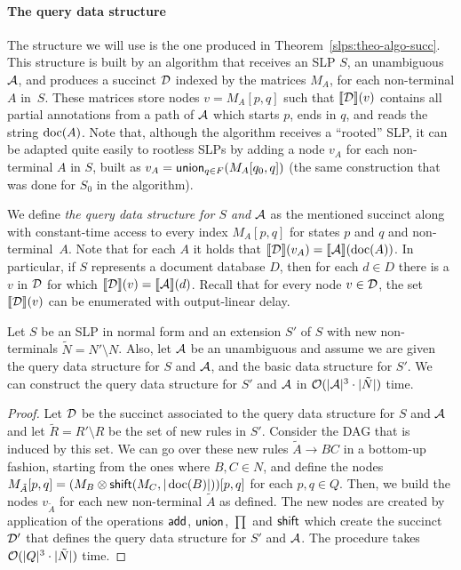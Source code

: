 \paragraph{The query data structure}
The structure we will use is the one produced in Theorem~\ref{slps:theo-algo-succ}. This structure is built by an algorithm that receives an SLP $S$, an unambiguous \crt $\mathcal{A}$, and produces a succinct \dsabbr $\mathcal{D}$ indexed by the matrices $M_A$, for each non-terminal $A$ in~$S$. These matrices store nodes $v = M_A[p,q]$ such that ${\llbracket{\mathcal{D}}\rrbracket}(v)$ contains all partial annotations from a path of $\mathcal{A}$ which starts $p$, ends in $q$, and reads the string $\operatorname{doc}(A)$. 
Note that, although the algorithm receives a ``rooted'' SLP, it can be adapted quite easily to rootless SLPs by adding a node $v_A$ for each non-terminal $A$ in $S$, built as $v_A = \mathsf{union}_{q\in F}(M_A[q_0, q])$ (the same construction that was done for $S_0$ in the algorithm).

We define {\it the query data structure for $S$ and $\mathcal{A}$} as the mentioned succinct \dsabbr along with constant-time access to every index $M_A[p,q]$ for states $p$ and $q$ and non-terminal~$A$. Note that for each $A$ it holds that ${\llbracket{\mathcal{D}}\rrbracket}(v_A) = {\llbracket{\mathcal{A}}\rrbracket}(\operatorname{doc}(A))$. In particular, if $S$ represents a document database $D$, then for each $d\in D$ there is a $v$ in $\mathcal{D}$ for which ${\llbracket{\mathcal{D}}\rrbracket}(v) = {\llbracket{\mathcal{A}}\rrbracket}(d)$. Recall that for every node $v\in \mathcal{D}$, the set ${\llbracket{\mathcal{D}}\rrbracket}(v)$ can be enumerated with output-linear delay.

\begin{lemma}\label{slps:lem:ecsext}
	Let $S$ be an SLP in normal form and an extension $S'$ of $S$ with new non-terminals $\tilde{N} = N' \setminus N$. Also, let $\mathcal{A}$ be an unambiguous \crt and assume we are given the query data structure for $S$ and $\mathcal{A}$, and the basic data structure for $S'$. We can construct the query data structure for $S'$ and $\mathcal{A}$ in $\mathcal{O}(|\mathcal{A}|^3\cdot|\tilde{N}|)$ time.
\end{lemma}
\begin{proof}
	Let $\mathcal{D}$ be the succinct \dsabbr associated to the query data structure for $S$ and $\mathcal{A}$ and let $\tilde{R} = R' \setminus R$ be the set of new rules in $S'$. Consider the DAG that is induced by this set. We can go over these new rules $\tilde{A}\to BC$ in a bottom-up fashion, starting from the ones where $B,C\in N$, and define the nodes $M_{\tilde{A}}[p,q] = (M_{B}\otimes \mathsf{shift}(M_C,|\operatorname{doc}(B)|))[p,q]$ for each $p,q\in Q$. Then, we build the nodes $v_{\tilde{A}}$ for each new non-terminal $\tilde{A}$ as defined. The new nodes are created by application of the \dsabbr operations $\mathsf{add}$, $\mathsf{union}$, $\prod$ and $\mathsf{shift}$ which create the succinct \dsabbr $\mathcal{D}'$ that defines the query data structure for $S'$ and $\mathcal{A}$. The procedure takes $\mathcal{O}(|Q|^3\cdot|\tilde{N}|)$ time.
\end{proof}

